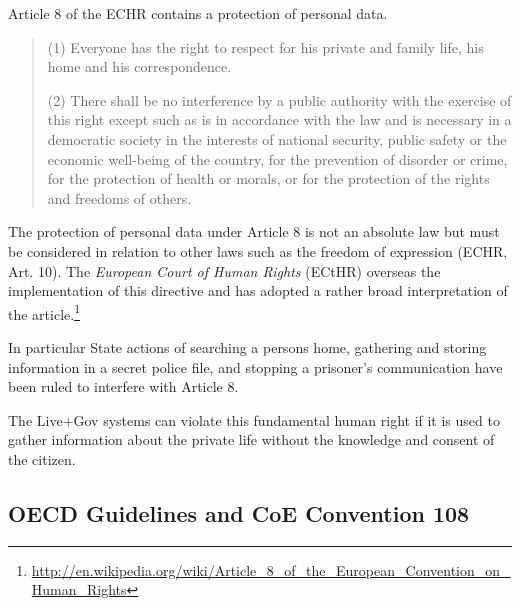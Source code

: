 Article 8 of the ECHR contains a protection of personal data.

\begin{quote}
(1) Everyone has the right to respect for his private and family life, his home and his correspondence.

(2) There shall be no interference by a public authority with the exercise of this right except such as is in accordance with the law and is necessary in a democratic society in the interests of national security, public safety or the economic well-being of the country, for the prevention of disorder or crime, for the protection of health or morals, or for the protection of the rights and freedoms of others.
\end{quote}

The protection of personal data under Article 8 is not an absolute law but must be considered in relation to other laws such as the freedom of expression (ECHR, Art. 10).
The \emph{European Court of Human Rights} (ECtHR) overseas the implementation of this directive and has adopted a rather broad interpretation of the article.\footnote{\url{http://en.wikipedia.org/wiki/Article_8_of_the_European_Convention_on_Human_Rights}}

In particular State actions of searching a persons home, gathering and storing information in a secret police file, and stopping a prisoner's communication have been ruled to interfere with Article 8.

The Live+Gov systems can violate this fundamental human right if it is used to gather information about the private life without the knowledge and consent of the citizen.


\subsection{OECD Guidelines and CoE Convention 108}

